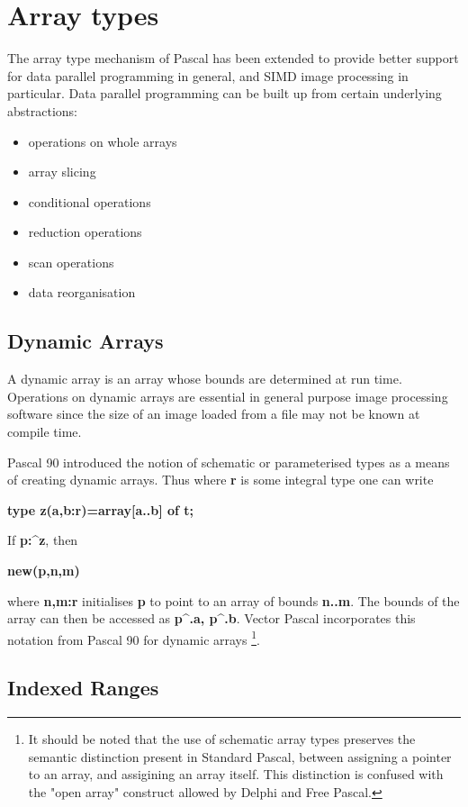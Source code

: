 \section*{Array types}
The array type mechanism of Pascal has been extended to
provide better support for data parallel programming in general,
and SIMD image processing in particular.
Data parallel programming can be built up from certain underlying
abstractions\cite{Ewing}:
\begin{itemize}
\item operations on whole arrays
\item array slicing
\item conditional operations
\item reduction operations
\item scan operations
\item data reorganisation
\end{itemize}

\subsection*{Dynamic Arrays}

A dynamic array is an array whose bounds are determined at run time. Operations
on dynamic arrays are essential in general purpose image processing software since
the size of an image loaded from a file may not be known at compile time.

Pascal 90\cite{ISO90} introduced the notion of schematic or parameterised types
as a means of creating dynamic arrays. Thus where \textbf{r} is some integral
type one can write 

\textbf{type z(a,b:r)=array{[}a..b{]} of t;}

If \textbf{p:\textasciicircum{}z}, then 

\textbf{new(p,n,m)}

where \textbf{n,m:r} initialises \textbf{p} to point to an array of bounds \textbf{n..m}.
The bounds of the array can then be accessed as \textbf{p\textasciicircum{}.a,
p\textasciicircum{}.b}. Vector Pascal incorporates this notation from Pascal
90 for dynamic arrays 
\footnote{
It should be noted that the use of schematic array types preserves the semantic distinction
present in Standard Pascal, between assigning a pointer to an array, and assigining an array itself.
This distinction is confused with the "open array" construct allowed by Delphi and Free Pascal.
}.
\subsection*{Indexed Ranges}

